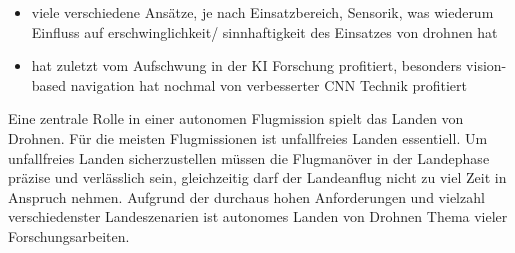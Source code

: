 \documentclass[12pt]{article}
\begin{document}
\begin{itemize}
    \item viele verschiedene Ansätze, je nach Einsatzbereich, Sensorik, was wiederum Einfluss auf erschwinglichkeit/ sinnhaftigkeit des Einsatzes von drohnen hat
    \item hat zuletzt vom Aufschwung in der KI Forschung profitiert, besonders vision-based navigation hat nochmal von verbesserter CNN Technik profitiert
\end{itemize}

Eine zentrale Rolle in einer autonomen Flugmission spielt das Landen von Drohnen. Für die meisten Flugmissionen ist unfallfreies Landen essentiell. Um unfallfreies Landen sicherzustellen müssen die Flugmanöver in der Landephase präzise und verlässlich sein, gleichzeitig darf der Landeanflug nicht zu viel Zeit in Anspruch nehmen. Aufgrund der durchaus hohen Anforderungen und vielzahl verschiedenster Landeszenarien ist autonomes Landen von Drohnen Thema vieler Forschungsarbeiten.

\newpage
\printbibliography
\end{document}
